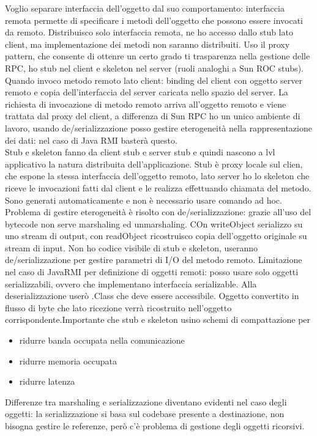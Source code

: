 \documentclass{article}
\begin{document}
Voglio separare interfaccia dell'oggetto dal suo comportamento: interfaccia remota permette di specificare i metodi dell'oggetto che possono essere invocati da remoto. Distribuisco solo interfaccia remota, ne ho accesso dallo stub lato client, ma implementazione dei metodi non saranno distribuiti. Uso il proxy pattern, che consente di ottenre un certo grado ti trasparenza nella gestione delle RPC, ho stub nel client e skeleton nel server (ruoli analoghi a Sun ROC stubs). Quando invoco metodo remoto lato client: binding del client con oggetto server remoto e copia dell'interfaccia del server caricata nello spazio del server. La richiesta di invocazione di metodo remoto arriva all'oggetto remoto e viene trattata dal proxy del client, a differenza di Sun RPC ho un unico ambiente di lavoro, usando de/serializzazione posso gestire eterogeneità nella rappresentazione dei dati: nel caso di Java RMI basterà questo.\\ Stub e skeleton fanno da client stub e server stub e quindi nascono a lvl applicativo la natura distribuita dell'applicazione. Stub è proxy locale sul clien, che espone la stessa interfaccia dell'oggetto remoto, lato server ho lo skeleton che riceve le invocazioni fatti dal client e le realizza effettuando chiamata del metodo.\\ Sono generati automaticamente e non è necessario usare comando ad hoc.\\ Problema di gestire eterogeneità è risolto con de/serializzazione: grazie all'uso del bytecode non serve marshaling ed unmarshaling. COn writeObject serializzo su uno stream di output, con readObject ricostruisco copia dell'oggetto originale su stream di input. Non ho codice visibile di stub e skeleton, useranno de/serializzazione per gestire parametri di I/O del metodo remoto. Limitazione nel caso di JavaRMI per definizione di oggetti remoti: posso usare solo oggetti serializzabili, ovvero che implementano interfaccia serializable. Alla deserializzazione userò .Class che deve essere accessibile. Oggetto convertito in flusso di byte che lato ricezione verrà ricostruito nell'oggetto corrispondente.Importante che stub e skeleton usino schemi di compattazione per
\begin{itemize}
\item ridurre banda occupata nella comunicazione
\item ridurre memoria occupata
\item ridurre latenza
\end{itemize}
Differenze tra marshaling e serializzazione diventano evidenti nel caso degli oggetti: la serializzazione si basa sul codebase presente a destinazione, non bisogna gestire le referenze, però c'è problema di gestione degli oggetti ricorsivi.
\end{document}
